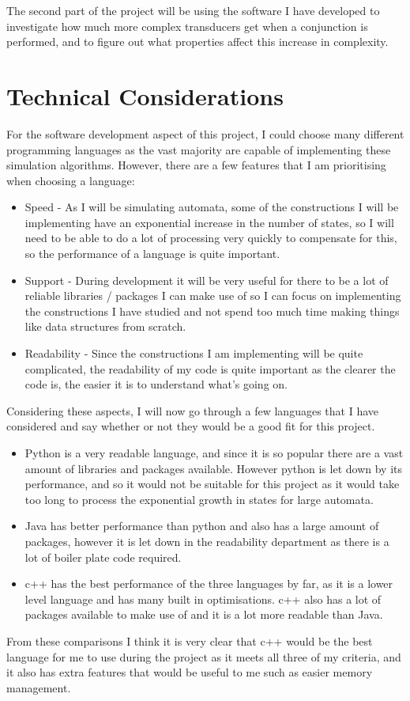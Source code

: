 \documentclass[12pt, a4paper]{article}
\begin{document}
The second part of the project will be using the software I have developed to investigate how much more complex transducers get when a conjunction is performed, and to figure out what properties affect this increase in complexity.


\section{Technical Considerations}

For the software development aspect of this project, I could choose many different programming languages as the vast majority are capable of implementing these simulation algorithms. However, there are a few features that I am prioritising when choosing a language:
\begin{itemize}
    \item Speed - As I will be simulating automata, some of the constructions I will be implementing have an exponential increase in the number of states, so I will need to be able to do a lot of processing very quickly to compensate for this, so the performance of a language is quite important. 
    \item Support - During development it will be very useful for there to be a lot of reliable libraries / packages I can make use of so I can focus on implementing the constructions I have studied and not spend too much time making things like data structures from scratch.
    \item Readability - Since the constructions I am implementing will be quite complicated, the readability of my code is quite important as the clearer the code is, the easier it is to understand what's going on.
\end{itemize}
Considering these aspects, I will now go through a few languages that I have considered and say whether or not they would be a good fit for this project.
\begin{itemize}
    \item Python is a very readable language, and since it is so popular there are a vast amount of libraries and packages available. However python is let down by its performance, and so it would not be suitable for this project as it would take too long to process the exponential growth in states for large automata.
    \item Java has better performance than python and also has a large amount of packages, however it is let down in the readability department as there is a lot of boiler plate code required.
    \item c++ has the best performance of the three languages by far, as it is a lower level language and has many built in optimisations. c++ also has a lot of packages available to make use of and it is a lot more readable than Java.
\end{itemize}
From these comparisons I think it is very clear that c++ would be the best language for me to use during the project as it meets all three of my criteria, and it also has extra features that would be useful to me such as easier memory management.
\end{document}
